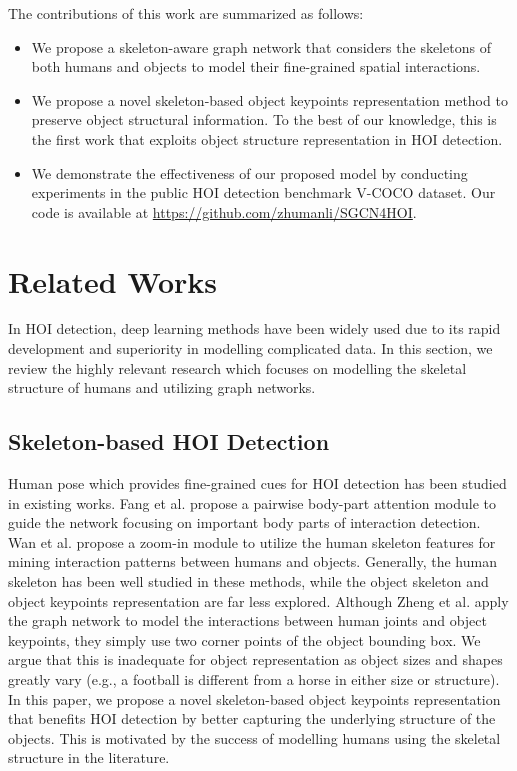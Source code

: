 \documentclass[a4paper, 10pt, conference]{IEEEtran}
\begin{document}
The contributions of this work are summarized as follows:
\begin{itemize}
    \item We propose a skeleton-aware graph network that considers the skeletons of both humans and objects to model their fine-grained spatial interactions.
    \item We propose a novel skeleton-based object keypoints representation method to preserve object structural information. To the best of our knowledge, this is the first work that exploits object structure representation in HOI detection.
    \item We demonstrate the effectiveness of our proposed model by conducting experiments in the public HOI detection benchmark V-COCO \cite{VSRL} dataset. Our code is available at \href{https://github.com/zhumanli/SGCN4HOI}{https://github.com/zhumanli/SGCN4HOI}.
\end{itemize}

\section{Related Works}
In HOI detection, deep learning methods have been widely used due to its rapid development and superiority in modelling complicated data. In this section, we review the highly relevant research which focuses on modelling the skeletal structure of humans and utilizing graph networks. 

\subsection{Skeleton-based HOI Detection}
Human pose which provides fine-grained cues for HOI detection has been studied in existing works. Fang et al. \cite{PD-Net} propose a pairwise body-part attention module to guide the network focusing on important body parts of interaction detection. Wan et al. \cite{PMFNet} propose a zoom-in module to utilize the human skeleton features for mining interaction patterns between humans and objects. Generally, the human skeleton has been well studied in these methods, while the object skeleton and object keypoints representation are far less explored. Although Zheng et al. \cite{SIGN} apply the graph network to model the interactions between human joints and object keypoints, they simply use two corner points of the object bounding box. We argue that this is inadequate for object representation as object sizes and shapes greatly vary (e.g., a football is different from a horse in either size or structure). In this paper, we propose a novel skeleton-based object keypoints representation that benefits HOI detection by better capturing the underlying structure of the objects. This is motivated by the success of modelling humans using the skeletal structure in the literature.
\end{document}
